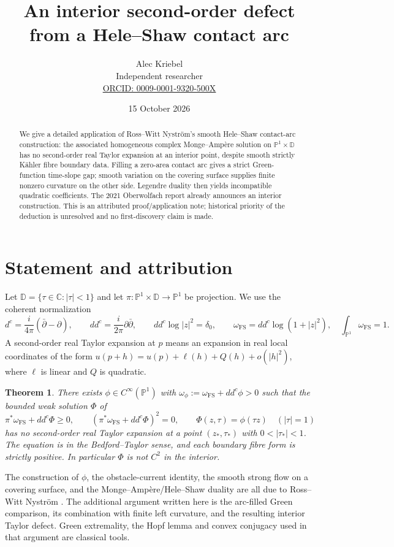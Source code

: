 \documentclass[11pt]{article}
\title{An interior second-order defect from a Hele--Shaw contact arc}
\author{Alec Kriebel\\\small Independent researcher\\
\small\href{https://orcid.org/0009-0001-9320-500X}{ORCID: 0009-0001-9320-500X}}
\date{15 October 2026}
\newtheorem{theorem}{Theorem}
\newcommand{\Pone}{\mathbb P^1}
\newcommand{\D}{\mathbb D}
\newcommand{\ddc}{dd^c}
\newcommand{\FS}{\omega_{\mathrm{FS}}}
\begin{document}
\maketitle
\begin{abstract}
We give a detailed application of Ross--Witt Nystr\"om's smooth Hele--Shaw
contact-arc construction: the associated homogeneous complex Monge--Amp\`ere
solution on $\Pone\times\D$ has no second-order real Taylor expansion at an
interior point, despite smooth strictly K\"ahler fibre boundary data. Filling
a zero-area contact arc gives a strict Green-function time-slope gap; smooth
variation on the covering surface supplies finite nonzero curvature on the
other side. Legendre duality then yields incompatible quadratic coefficients.
The 2021 Oberwolfach report already announces an interior construction.
This is an attributed proof/application note; historical priority of the
deduction is unresolved and no first-discovery claim is made.
\end{abstract}

\section{Statement and attribution}
Let $\D=\{\tau\in\mathbb C:|\tau|<1\}$ and let $\pi:\Pone\times\D\to\Pone$
be projection. We use the coherent normalization
\[
 d^c=\frac{i}{4\pi}(\bar\partial-\partial),\qquad
 \ddc=\frac{i}{2\pi}\partial\bar\partial,\qquad
 \ddc\log|z|^2=\delta_0,\qquad
 \FS=\ddc\log(1+|z|^2),\quad \int_{\Pone}\FS=1.
\]
A second-order real Taylor expansion at $p$ means an expansion in real local
coordinates of the form $u(p+h)=u(p)+\ell(h)+Q(h)+o(|h|^2)$, where $\ell$ is
linear and $Q$ is quadratic.

\begin{theorem}\label{thm:main}
There exists $\phi\in C^\infty(\Pone)$ with
$\omega_\phi:=\FS+\ddc\phi>0$ such that the bounded weak solution $\Phi$ of
\begin{equation}\label{eq:pde}
 \pi^*\FS+\ddc\Phi\geq0,\qquad
 (\pi^*\FS+\ddc\Phi)^2=0,\qquad
 \Phi(z,\tau)=\phi(\tau z)\quad (|\tau|=1)
\end{equation}
has no second-order real Taylor expansion at a point $(z_*,\tau_*)$ with
$0<|\tau_*|<1$. The equation is in the Bedford--Taylor sense, and each
boundary fibre form is strictly positive. In particular $\Phi$ is not $C^2$
in the interior.
\end{theorem}

The construction of $\phi$, the obstacle-current identity, the smooth strong
flow on a covering surface, and the Monge--Amp\`ere/Hele--Shaw duality are
all due to Ross--Witt Nystr\"om \cite{applications,harmonic}.
The additional argument written here is the arc-filled Green comparison,
its combination with finite left curvature, and the resulting interior
Taylor defect. Green extremality, the Hopf lemma and convex conjugacy used
in that argument are classical tools.
\end{document}
